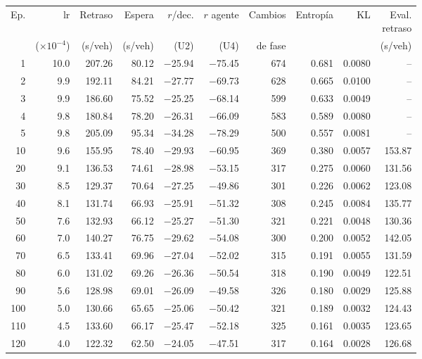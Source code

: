 \begin{table}[H]
\centering
\scriptsize
\setlength{\tabcolsep}{3pt}
\setlength{\tabcolsep}{2pt}
\begin{tabular}{rrrrrrrrrr}
\toprule
Ep. & lr & Retraso & Espera & $r$/dec. & $r$ agente & Cambios & Entropía & KL & \makecell{Eval.\\retraso} \\
 & ($\times 10^{-4}$) & (s/veh) & (s/veh) & (U2) & (U4) & de fase &  &  & (s/veh) \\
\midrule
1 & 10.0 & 207.26 & 80.12 & $-$25.94 & $-$75.45 & 674 & 0.681 & 0.0080 & -- \\
2 & 9.9 & 192.11 & 84.21 & $-$27.77 & $-$69.73 & 628 & 0.665 & 0.0100 & -- \\
3 & 9.9 & 186.60 & 75.52 & $-$25.25 & $-$68.14 & 599 & 0.633 & 0.0049 & -- \\
4 & 9.8 & 180.84 & 78.20 & $-$26.31 & $-$66.09 & 583 & 0.589 & 0.0080 & -- \\
5 & 9.8 & 205.09 & 95.34 & $-$34.28 & $-$78.29 & 500 & 0.557 & 0.0081 & -- \\
10 & 9.6 & 155.95 & 78.40 & $-$29.93 & $-$60.95 & 369 & 0.380 & 0.0057 & 153.87 \\
20 & 9.1 & 136.53 & 74.61 & $-$28.98 & $-$53.15 & 317 & 0.275 & 0.0060 & 131.56 \\
30 & 8.5 & 129.37 & 70.64 & $-$27.25 & $-$49.86 & 301 & 0.226 & 0.0062 & 123.08 \\
40 & 8.1 & 131.74 & 66.93 & $-$25.91 & $-$51.32 & 308 & 0.245 & 0.0084 & 135.77 \\
50 & 7.6 & 132.93 & 66.12 & $-$25.27 & $-$51.30 & 321 & 0.221 & 0.0048 & 130.36 \\
60 & 7.0 & 140.27 & 76.75 & $-$29.62 & $-$54.08 & 300 & 0.200 & 0.0052 & 142.05 \\
70 & 6.5 & 133.41 & 69.96 & $-$27.04 & $-$52.02 & 315 & 0.191 & 0.0055 & 131.59 \\
80 & 6.0 & 131.02 & 69.26 & $-$26.36 & $-$50.54 & 318 & 0.190 & 0.0049 & 122.51 \\
90 & 5.6 & 128.98 & 69.01 & $-$26.09 & $-$49.58 & 326 & 0.180 & 0.0029 & 125.88 \\
100 & 5.0 & 130.66 & 65.65 & $-$25.06 & $-$50.42 & 321 & 0.189 & 0.0032 & 124.43 \\
110 & 4.5 & 133.60 & 66.17 & $-$25.47 & $-$52.18 & 325 & 0.161 & 0.0035 & 123.65 \\
120 & 4.0 & 122.32 & 62.50 & $-$24.05 & $-$47.51 & 317 & 0.164 & 0.0028 & 126.68 \\

\end{tabular}
\end{table}
